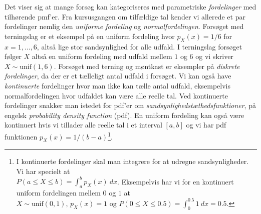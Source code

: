 Det viser sig at mange forsøg kan kategoriseres med parametriske \textit{fordelinger} med tilhørende pmf'er. Fra kursusgangen om tilfældige tal kender vi allerede et par fordelinger nemlig den \textit{uniforme fordeling}  og \textit{normalfordelingen}. Forsøget med terningslag er et eksempel på en uniform fordeling hvor $p_X(x) = 1/6$ for $x = 1,\dots, 6$, altså lige stor sandsynlighed for alle udfald. I terningslag forsøget følger $X$ altså en uniform fordeling med udfald mellem $1$ og $6$ og vi skriver $X \sim \text{unif}(1,6)$. Forsøget med terning og møntkast er eksempler på \textit{diskrete fordelinger}, da der er et tælleligt antal udfald i forsøget. Vi kan også have \textit{kontinuerte} fordelinger hvor man ikke kan tælle antal udfald, eksempelvis normalfordelingen hvor udfaldet kan være alle reelle tal. Ved kontinuerte fordelinger snakker man istedet for pdf'er om \textit{sandsynlighedstæthedsfunktioner}, på engelsk \textit{probability density function} (pdf). En uniform fordeling kan også være kontinuert hvis vi tillader alle reelle tal i et interval $[a,b]$ og vi har pdf funktionen $p_X(x) = 1/(b-a)$\footnote{I kontinuerte fordelinger skal man integrere for at udregne sandsynligheder. Vi har specielt at \\
 $P(a \leq X \leq b) = \int_a^b p_X(x)\ dx$. Eksempelvis har vi for en kontinuert uniform fordelingen mellem $0$ og $1$ at\\ $X \sim \text{unif}(0,1)$, $p_X(x) = 1$ og $P(0 \leq X \leq 0.5) = \int_0^{0.5} 1 \ dx = 0.5$.}.